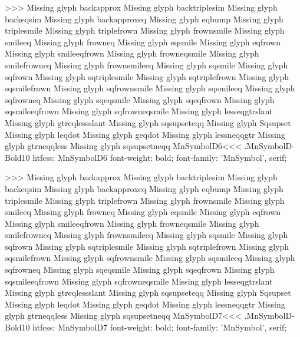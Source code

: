>>>
Missing glyph	backapprox
Missing glyph	backtriplesim
Missing glyph	backeqsim
Missing glyph	backapproxeq
Missing glyph	eqbump
Missing glyph	triplesmile
Missing glyph	triplefrown
Missing glyph	frownsmile
Missing glyph	smileeq
Missing glyph	frowneq
Missing glyph	eqsmile
Missing glyph	eqfrown
Missing glyph	smileeqfrown
Missing glyph	frowneqsmile
Missing glyph	smilefrowneq
Missing glyph	frownsmileeq
Missing glyph	sqsmile
Missing glyph	sqfrown
Missing glyph	sqtriplesmile
Missing glyph	sqtriplefrown
Missing glyph	sqsmilefrown
Missing glyph	sqfrownsmile
Missing glyph	sqsmileeq
Missing glyph	sqfrowneq
Missing glyph	sqeqsmile
Missing glyph	sqeqfrown
Missing glyph	sqsmileeqfrown
Missing glyph	sqfrowneqsmile
Missing glyph	lesseqgtrslant
Missing glyph	gtreqlessslant
Missing glyph	sqsupseteqq
Missing glyph	Sqsupset
Missing glyph	leqdot
Missing glyph	geqdot
Missing glyph	lessneqqgtr
Missing glyph	gtrneqqless
Missing glyph	sqsupsetneqq
\<MnSymbolD6\><<<
.MnSymbolD-Bold10
htfcss:  MnSymbolD6  font-weight: bold; font-family: 'MnSymbol', serif;

>>>
Missing glyph	backapprox
Missing glyph	backtriplesim
Missing glyph	backeqsim
Missing glyph	backapproxeq
Missing glyph	eqbump
Missing glyph	triplesmile
Missing glyph	triplefrown
Missing glyph	frownsmile
Missing glyph	smileeq
Missing glyph	frowneq
Missing glyph	eqsmile
Missing glyph	eqfrown
Missing glyph	smileeqfrown
Missing glyph	frowneqsmile
Missing glyph	smilefrowneq
Missing glyph	frownsmileeq
Missing glyph	sqsmile
Missing glyph	sqfrown
Missing glyph	sqtriplesmile
Missing glyph	sqtriplefrown
Missing glyph	sqsmilefrown
Missing glyph	sqfrownsmile
Missing glyph	sqsmileeq
Missing glyph	sqfrowneq
Missing glyph	sqeqsmile
Missing glyph	sqeqfrown
Missing glyph	sqsmileeqfrown
Missing glyph	sqfrowneqsmile
Missing glyph	lesseqgtrslant
Missing glyph	gtreqlessslant
Missing glyph	sqsupseteqq
Missing glyph	Sqsupset
Missing glyph	leqdot
Missing glyph	geqdot
Missing glyph	lessneqqgtr
Missing glyph	gtrneqqless
Missing glyph	sqsupsetneqq
\<MnSymbolD7\><<<
.MnSymbolD-Bold10
htfcss:  MnSymbolD7  font-weight: bold; font-family: 'MnSymbol', serif;

